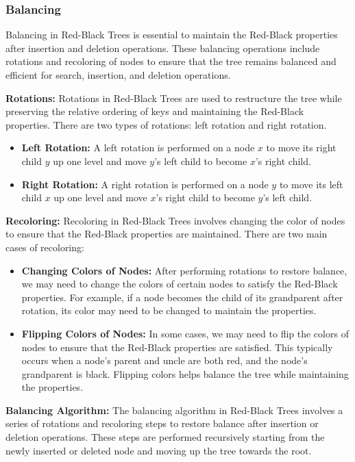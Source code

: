 \documentclass[12pt]{book} %
\begin{document}
\subsubsection{Balancing}
Balancing in Red-Black Trees is essential to maintain the Red-Black properties after insertion and deletion operations. These balancing operations include rotations and recoloring of nodes to ensure that the tree remains balanced and efficient for search, insertion, and deletion operations.

\textbf{Rotations:} Rotations in Red-Black Trees are used to restructure the tree while preserving the relative ordering of keys and maintaining the Red-Black properties. There are two types of rotations: left rotation and right rotation.

\begin{itemize}
    \item \textbf{Left Rotation:} A left rotation is performed on a node \(x\) to move its right child \(y\) up one level and move \(y\)'s left child to become \(x\)'s right child.
    
    \item \textbf{Right Rotation:} A right rotation is performed on a node \(y\) to move its left child \(x\) up one level and move \(x\)'s right child to become \(y\)'s left child.
\end{itemize}

\textbf{Recoloring:} Recoloring in Red-Black Trees involves changing the color of nodes to ensure that the Red-Black properties are maintained. There are two main cases of recoloring:

\begin{itemize}
    \item \textbf{Changing Colors of Nodes:} After performing rotations to restore balance, we may need to change the colors of certain nodes to satisfy the Red-Black properties. For example, if a node becomes the child of its grandparent after rotation, its color may need to be changed to maintain the properties.
    
    \item \textbf{Flipping Colors of Nodes:} In some cases, we may need to flip the colors of nodes to ensure that the Red-Black properties are satisfied. This typically occurs when a node's parent and uncle are both red, and the node's grandparent is black. Flipping colors helps balance the tree while maintaining the properties.
\end{itemize}

\textbf{Balancing Algorithm:} The balancing algorithm in Red-Black Trees involves a series of rotations and recoloring steps to restore balance after insertion or deletion operations. These steps are performed recursively starting from the newly inserted or deleted node and moving up the tree towards the root.
\end{document}
